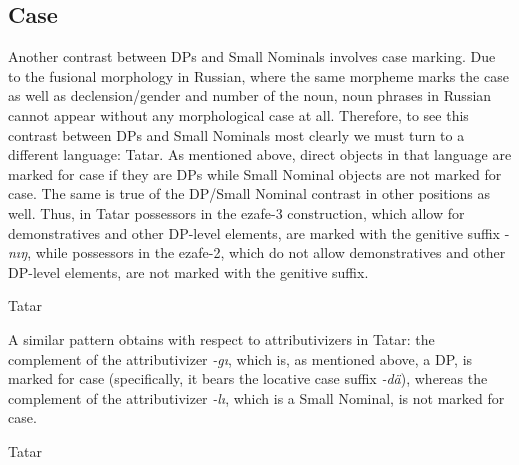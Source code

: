 \documentclass[output=paper]{langsci/langscibook}
\begin{document}
\subsection{Case}  %

Another contrast between DPs and Small Nominals involves case marking. 
Due to the fusional morphology in Russian, where the same morpheme marks the case as well as declension/gender and number of the noun, 
noun phrases in Russian cannot appear without any morphological case at all. 
Therefore, to see this contrast between DPs and Small Nominals most clearly we must turn to a different language: Tatar. 
As mentioned above, direct objects in that language are marked for case if they are DPs while Small Nominal objects are not marked for case. 
The same is true of the DP/Small Nominal contrast in other positions as well. 
Thus, in Tatar possessors in the ezafe-3 construction, which allow for demonstratives and other DP-level elements, 
are marked with the genitive suffix -\textit{nıŋ}, 
while possessors in the ezafe-2, which do not allow demonstratives and other DP-level elements, are not marked with the genitive suffix.

\ea%
    \label{pereex:key:14}
    Tatar 
    \z 
\z 

A similar pattern obtains with respect to attributivizers in Tatar: 
the complement of the attributivizer \textit{{}-gı}, which is, as mentioned above, a DP, is marked for case 
(specifically, it bears the locative case suffix \textit{\nobreakdash-dä}), 
whereas the complement of the attributivizer \textit{\nobreakdash-lı}, which is a Small Nominal, is not marked for case.

\ea%
    \label{pereex:key:15}
    Tatar 
    \z 
\z 
\end{document}
